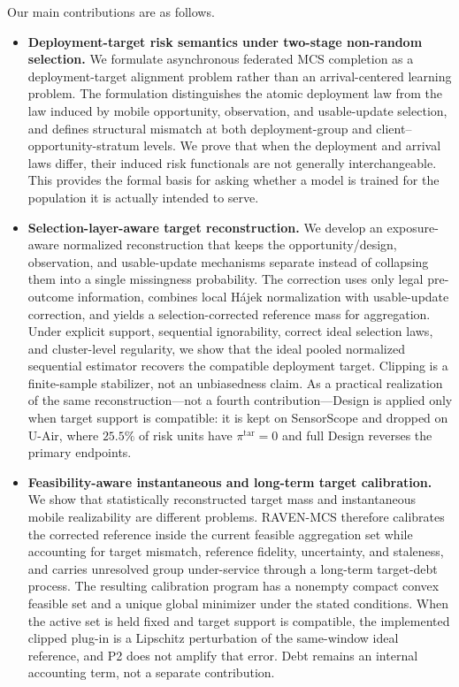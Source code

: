 \documentclass[letterpaper,journal]{IEEEtran}
\begin{document}
Our main contributions are as follows.

\begin{itemize}
    \item \textbf{Deployment-target risk semantics under two-stage non-random
    selection.}
    We formulate asynchronous federated MCS completion as a
    deployment-target alignment problem rather than an arrival-centered
    learning problem.  The formulation distinguishes the atomic deployment law
    from the law induced by mobile opportunity, observation, and usable-update
    selection, and defines structural mismatch at both deployment-group and
    client--opportunity-stratum levels.  We prove that when the deployment and
    arrival laws differ, their induced risk functionals are not generally
    interchangeable.  This provides the formal basis for asking whether a model
    is trained for the population it is actually intended to serve.

    \item \textbf{Selection-layer-aware target reconstruction.}
    We develop an exposure-aware normalized reconstruction that keeps the
    opportunity/design, observation, and usable-update mechanisms separate
    instead of collapsing them into a single missingness probability.  The
    correction uses only legal pre-outcome information, combines local
    H\'ajek normalization with usable-update correction, and yields a
    selection-corrected reference mass for aggregation.  Under explicit support,
    sequential ignorability, correct ideal selection laws, and cluster-level
    regularity, we show that the ideal pooled normalized sequential estimator
    recovers the compatible deployment target.  Clipping is a finite-sample
    stabilizer, not an unbiasedness claim.  As a practical realization of the
    same reconstruction---not a fourth contribution---Design is applied only
    when target support is compatible: it is kept on SensorScope and dropped
    on U-Air, where \(25.5\%\) of risk units have \(\pi^{\mathrm{tar}}=0\) and
    full Design reverses the primary endpoints.

    \item \textbf{Feasibility-aware instantaneous and long-term target
    calibration.}
    We show that statistically reconstructed target mass and instantaneous
    mobile realizability are different problems.  RAVEN-MCS therefore
    calibrates the corrected reference inside the current feasible aggregation
    set while accounting for target mismatch, reference fidelity, uncertainty,
    and staleness, and carries unresolved group under-service through a
    long-term target-debt process.  The resulting calibration program has a
    nonempty compact convex feasible set and a unique global minimizer under the
    stated conditions.  When the active set is held fixed and target support is
    compatible, the implemented clipped plug-in is a Lipschitz perturbation of
    the same-window ideal reference, and P2 does not amplify that error.
    Debt remains an internal accounting term, not a separate contribution.
\end{itemize}
\end{document}
